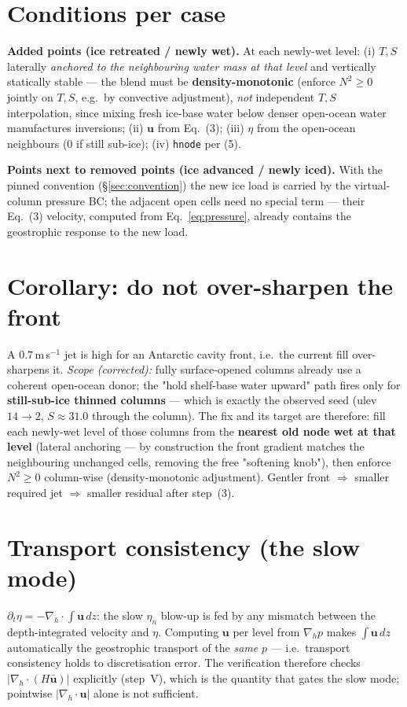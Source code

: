\documentclass[11pt,a4paper]{article}
\newcommand{\code}[1]{\texttt{#1}}
\newcommand{\uvec}{\mathbf{u}}
\begin{document}
\section{Conditions per case}\label{sec:cases}
\textbf{Added points (ice retreated / newly wet).} At each newly-wet level: (i) $T,S$ laterally
\emph{anchored to the neighbouring water mass at that level} and vertically statically stable ---
the blend must be \textbf{density-monotonic} (enforce $N^2\ge0$ jointly on $T,S$, e.g.\ by
convective adjustment), \emph{not} independent $T,S$ interpolation, since mixing fresh ice-base
water below denser open-ocean water manufactures inversions; (ii) $\uvec$ from Eq.~(3);
(iii) $\eta$ from the open-ocean neighbours (0 if still sub-ice); (iv) \code{hnode} per (5).

\textbf{Points next to removed points (ice advanced / newly iced).} With the pinned convention
(\S\ref{sec:convention}) the new ice load is carried by the virtual-column pressure BC; the
adjacent open cells need no special term --- their Eq.~(3) velocity, computed from
Eq.~\eqref{eq:pressure}, already contains the geostrophic response to the new load.

\section{Corollary: do not over-sharpen the front}\label{sec:soften}
A $0.7$\,m\,s$^{-1}$ jet is high for an Antarctic cavity front, i.e.\ the current fill
over-sharpens it. \emph{Scope (corrected):} fully surface-opened columns already use a coherent
open-ocean donor; the "hold shelf-base water upward" path fires only for \textbf{still-sub-ice
thinned columns} --- which is exactly the observed seed (ulev $14\!\to\!2$, $S\approx31.0$ through
the column). The fix and its target are therefore: fill each newly-wet level of those columns from
the \textbf{nearest old node wet at that level} (lateral anchoring --- by construction the front
gradient matches the neighbouring unchanged cells, removing the free "softening knob"), then
enforce $N^2\ge0$ column-wise (density-monotonic adjustment). Gentler front $\Rightarrow$ smaller
required jet $\Rightarrow$ smaller residual after step~(3).

\section{Transport consistency (the slow mode)}\label{sec:transport}
$\partial_t\eta=-\nabla_h\!\cdot\!\int\uvec\,dz$: the slow $\eta_n$ blow-up is fed by any mismatch
between the depth-integrated velocity and $\eta$. Computing $\uvec$ per level from $\nabla_h p$
makes $\int\uvec\,dz$ automatically the geostrophic transport of the \emph{same} $p$ --- i.e.\
transport consistency holds to discretisation error. The verification therefore checks
$|\nabla_h\!\cdot(H\bar{\uvec})|$ explicitly (step~V), which is the quantity that gates the slow
mode; pointwise $|\nabla_h\!\cdot\uvec|$ alone is not sufficient.
\end{document}
